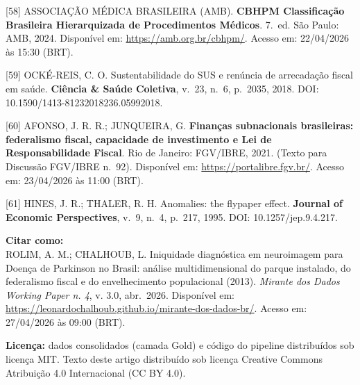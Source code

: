 \documentclass[12pt,a4paper,oneside]{article}
\begin{document}
\begin{singlespace}
\noindent\hangindent=1.25cm\label{ref:cbhpm}
[58] ASSOCIA\c{C}\~AO M\'EDICA BRASILEIRA (AMB). \textbf{CBHPM
\textemdash{} Classifica\c{c}\~ao Brasileira Hierarquizada de
Procedimentos M\'edicos}. 7.\ ed. S\~ao Paulo: AMB, 2024.
Dispon\'ivel em: \url{https://amb.org.br/cbhpm/}. Acesso em:
22/04/2026 \`as 15:30 (BRT).
\par\smallskip

\noindent\hangindent=1.25cm\label{ref:ocke-reis}
[59] OCK\'E-REIS, C. O. Sustentabilidade do SUS e ren\'uncia de
arrecada\c{c}\~ao fiscal em sa\'ude. \textbf{Ci\^encia \& Sa\'ude
Coletiva}, v.\ 23, n.\ 6, p.\ 2035, 2018. DOI:
10.1590/1413-81232018236.05992018.
\par\smallskip

\noindent\hangindent=1.25cm\label{ref:afonso-junqueira}
[60] AFONSO, J. R. R.; JUNQUEIRA, G. \textbf{Finan\c{c}as
subnacionais brasileiras: federalismo fiscal, capacidade de
investimento e Lei de Responsabilidade Fiscal}. Rio de Janeiro:
FGV/IBRE, 2021. (Texto para Discuss\~ao FGV/IBRE n.\ 92).
Dispon\'ivel em: \url{https://portalibre.fgv.br/}. Acesso em:
23/04/2026 \`as 11:00 (BRT).
\par\smallskip

\noindent\hangindent=1.25cm\label{ref:hines-thaler}
[61] HINES, J. R.; THALER, R. H. Anomalies: the flypaper effect.
\textbf{Journal of Economic Perspectives}, v.\ 9, n.\ 4,
p.\ 217, 1995. DOI: 10.1257/jep.9.4.217.
\par\smallskip

\end{singlespace}

\vspace{1cm}

\noindent\textbf{Citar como:}\\
ROLIM, A. M.; CHALHOUB, L. Iniquidade diagnóstica em neuroimagem
para Doença de Parkinson no Brasil: análise multidimensional do
parque instalado, do federalismo fiscal e do envelhecimento
populacional (2013). \textit{Mirante dos Dados
\textemdash{} Working Paper n. 4}, v. 3.0, abr.\ 2026. Disponível em:
\url{https://leonardochalhoub.github.io/mirante-dos-dados-br/}.
Acesso em: 27/04/2026 às 09:00 (BRT).

\vspace{0.5cm}

\noindent\textbf{Licença:} dados consolidados (camada Gold) e código
do pipeline distribuídos sob licença MIT. Texto deste artigo
distribuído sob licença Creative Commons Atribuição 4.0 Internacional
(CC BY 4.0).
\end{document}
